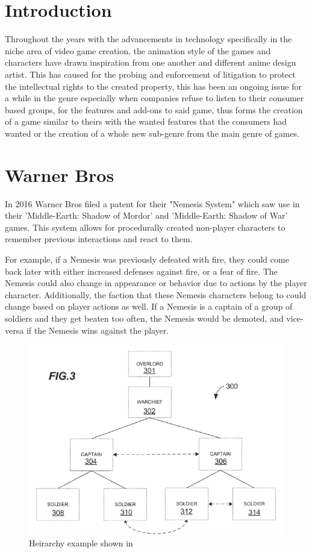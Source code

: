 \documentclass[12pt,letterpaper]{article}
\begin{document}
\section{Introduction}
Throughout the years with the advancements in technology specifically in the niche area of video game creation, the animation style of the games and characters have drawn inspiration from one another and different anime design artist.
This has caused for the probing and enforcement of litigation to protect the intellectual rights to the created property, this has been an ongoing issue for a while in the genre especially when companies refuse to listen to their consumer based groups,
for the features and add-ons to said game, thus forms the creation of a game similar to theirs with the wanted features that the consumers had wanted or the creation of a whole new sub-genre from the main genre of games.


\section {Warner Bros}
In 2016 Warner Bros filed a patent for their "Nemesis System" which saw use in their 'Middle-Earth: Shadow of Mordor' and 'Middle-Earth: Shadow of War' games. This system allows for procedurally created non-player characters to remember previous interactions and react to them.

For example, if a Nemesis was previously defeated with fire, they could come back later with either increased defenses against fire, or a fear of fire. The Nemesis could also change in appearance or behavior due to actions by the player character. Additionally, the faction that these Nemesis characters belong to could change based on player actions as well. If a Nemesis is a captain of a group of soldiers and they get beaten too often, the Nemesis would be demoted, and vice-versa if the Nemesis wins against the player.
\begin{figure}
    \centering
    \includegraphics[width=0.5\linewidth]{nemesis.PNG}
    \caption{Heirarchy example shown in \cite{wb}}
    \label{fig:seanpic}
\end{figure}
\end{document}
